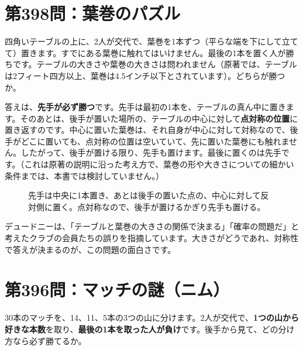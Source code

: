 \documentclass[a4paper,11pt,openany]{ltjsbook}
\begin{document}
\section{第398問：葉巻のパズル}

四角いテーブルの上に、2人が交代で、葉巻を1本ずつ（平らな端を下にして立てて）置きます。すでにある葉巻に触れてはいけません。最後の1本を置く人が勝ちです。テーブルの大きさや葉巻の大きさは問われません（原著では、テーブルは2フィート四方以上、葉巻は4.5インチ以下とされています）。どちらが勝つか。

答えは、\textbf{先手が必ず勝つ}です。先手は最初の1本を、テーブルの真ん中に置きます。そのあとは、後手が置いた場所の、テーブルの中心に対して\textbf{点対称の位置}に置き返すのです。中心に置いた葉巻は、それ自身が中心に対して対称なので、後手がどこに置いても、点対称の位置は空いていて、先に置いた葉巻にも触れません。したがって、後手が置ける限り、先手も置けます。最後に置くのは先手です。（これは原著の説明に沿った考え方で、葉巻の形や大きさについての細かい条件までは、本書では検討していません。）

\begin{figure}[htbp]
\centering
{}
\caption{先手は中央に1本置き、あとは後手の置いた点の、中心に対して反対側に置く。点対称なので、後手が置けるかぎり先手も置ける。}
\end{figure}

デュードニーは、「テーブルと葉巻の大きさの関係で決まる」「確率の問題だ」と考えたクラブの会員たちの誤りを指摘しています。大きさがどうであれ、対称性で答えが決まるのが、この問題の面白さです。

\section{第396問：マッチの謎（ニム）}

30本のマッチを、14、11、5本の3つの山に分けます。2人が交代で、\textbf{1つの山から好きな本数}を取り、\textbf{最後の1本を取った人が負け}です。後手から見て、どの分け方なら必ず勝てるか。
\end{document}
